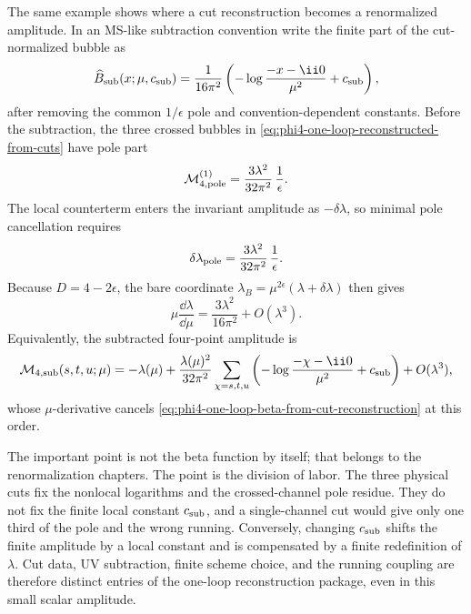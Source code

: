 \begin{controlledapproximation}
\label{ca:phi4-cut-invisible-uv-running}
The same example shows where a cut reconstruction becomes a renormalized
amplitude.  In an MS-like subtraction convention write the finite part of the
cut-normalized bubble as
\begin{equation}
  \widehat B_{\rm sub}(x;\mu,c_{\rm sub})
  =
  \frac1{16\pi^2}
  \left(
    -\log\frac{-x-\ii0}{\mu^2}+c_{\rm sub}
  \right),
  \label{eq:phi4-subtracted-bubble-finite-part}
\end{equation}
after removing the common \(1/\epsilon\) pole and convention-dependent
constants.  Before the subtraction, the three crossed bubbles in
\eqref{eq:phi4-one-loop-reconstructed-from-cuts} have pole part
\begin{equation}
  \mathcal M_{4,\rm pole}^{(1)}
  =
  \frac{3\lambda^2}{32\pi^2}\,\frac1\epsilon .
  \label{eq:phi4-one-loop-cut-pole-residue}
\end{equation}
The local counterterm enters the invariant amplitude as \(-\delta\lambda\), so
minimal pole cancellation requires
\begin{equation}
  \delta\lambda_{\rm pole}
  =
  \frac{3\lambda^2}{32\pi^2}\,\frac1\epsilon .
  \label{eq:phi4-ms-pole-counterterm-from-cuts}
\end{equation}
Because \(D=4-2\epsilon\), the bare coordinate
\(\lambda_B=\mu^{2\epsilon}(\lambda+\delta\lambda)\) then gives
\begin{equation}
  \mu\frac{\dd\lambda}{\dd\mu}
  =
  \frac{3\lambda^2}{16\pi^2}+O(\lambda^3).
  \label{eq:phi4-one-loop-beta-from-cut-reconstruction}
\end{equation}
Equivalently, the subtracted four-point amplitude is
\begin{equation}
  \mathcal M_{4,\rm sub}(s,t,u;\mu)
  =
  -\lambda(\mu)
  +
  \frac{\lambda(\mu)^2}{32\pi^2}
  \sum_{\chi=s,t,u}
  \left(
    -\log\frac{-\chi-\ii0}{\mu^2}+c_{\rm sub}
  \right)
  +O(\lambda^3),
  \label{eq:phi4-renormalized-one-loop-amplitude-from-cuts}
\end{equation}
whose \(\mu\)-derivative cancels
\eqref{eq:phi4-one-loop-beta-from-cut-reconstruction} at this order.

The important point is not the beta function by itself; that belongs to the
renormalization chapters.  The point is the division of labor.  The three
physical cuts fix the nonlocal logarithms and the crossed-channel pole
residue.  They do not fix the finite local constant \(c_{\rm sub}\), and a
single-channel cut would give only one third of the pole and the wrong
running.  Conversely, changing \(c_{\rm sub}\) shifts the finite amplitude by a
local constant and is compensated by a finite redefinition of \(\lambda\).  Cut
data, UV subtraction, finite scheme choice, and the running coupling are
therefore distinct entries of the one-loop reconstruction package, even in this
small scalar amplitude.
\end{controlledapproximation}

